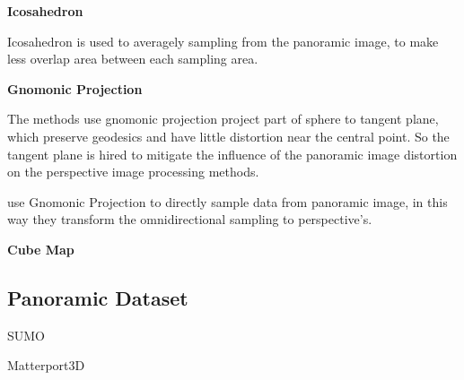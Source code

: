 \textbf{Icosahedron}

Icosahedron is used to averagely sampling from the panoramic image, to make less overlap area between each sampling area.

\citet{eder2019mapped}





\textbf{Gnomonic Projection} ~\citet{gnomonicprojection}

The methods use gnomonic projection project part of sphere to tangent plane, which preserve geodesics and have little distortion near the central point.
So the tangent plane is hired to mitigate the influence of the panoramic image  distortion on the perspective image processing methods.

\citet{coors2018spherenet} use Gnomonic Projection to directly sample data from panoramic image, in this way they transform the omnidirectional sampling to perspective's.

\textbf{Cube Map}


\subsection{Panoramic Dataset}


SUMO

Matterport3D

